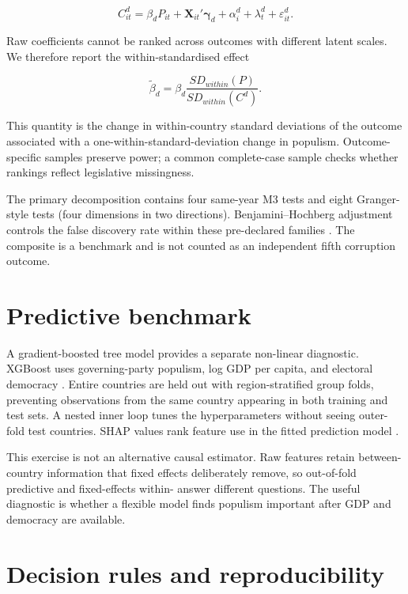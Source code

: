 \begin{equation}
  C^d_{it} = \beta_d P_{it} + \mathbf{X}_{it}'\boldsymbol{\gamma}_d
  + \alpha^d_i + \lambda^d_t + \varepsilon^d_{it}.
  \label{eq:decomposition}
\end{equation}

Raw coefficients cannot be ranked across outcomes with different latent scales. We therefore report
the within-standardised effect

\begin{equation}
  \widetilde{\beta}_d = \beta_d
  \frac{SD_{within}(P)}{SD_{within}(C^d)}.
\end{equation}

This quantity is the change in within-country standard deviations of the outcome associated with a
one-within-standard-deviation change in populism. Outcome-specific samples preserve power; a common
complete-case sample checks whether rankings reflect legislative missingness.

The primary decomposition contains four same-year M3 tests and eight Granger-style tests (four
dimensions in two directions). Benjamini--Hochberg adjustment controls the false discovery rate within
these pre-declared families \citep{benjamini1995}. The composite is a benchmark and is not counted as
an independent fifth corruption outcome.

\section{Predictive benchmark}

A gradient-boosted tree model provides a separate non-linear diagnostic. XGBoost uses governing-party
populism, log GDP per capita, and electoral democracy \citep{chen2016}. Entire countries are held out
with region-stratified group folds, preventing observations from the same country appearing in both
training and test sets. A nested inner loop tunes the hyperparameters without seeing outer-fold test
countries. SHAP values rank feature use in the fitted prediction model \citep{lundberg2017}.

This exercise is not an alternative causal estimator. Raw features retain between-country information
that fixed effects deliberately remove, so out-of-fold predictive \Rtwo{} and fixed-effects within-
\Rtwo{} answer different questions. The useful diagnostic is whether a flexible model finds populism
important after GDP and democracy are available.

\section{Decision rules and reproducibility}

